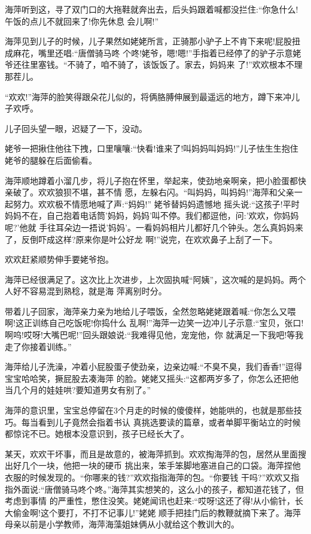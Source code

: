 \documentclass[11pt,a4paper,onecolumn]{article}
\begin{document}
海萍听到这，寻了双门口的大拖鞋就奔出去，后头妈跟着喊都没拦住:``你急什么!午饭的点儿不就回来了!你先休息
会儿啊!''

海萍见到儿子的时候，儿子果然如姥姥所言，正骑那小驴子上不肯下来呢!屁股扭成麻花，嘴里还唱:``唐僧骑马咚
个咚!姥爷，嗯!嗯!''手指着已经停了的驴子示意姥爷还往里塞钱。``不骑了，咱不骑了，该饭饭了。家去，妈妈来
了!''欢欢根本不理那茬儿。

``欢欢!''海萍的脸笑得跟朵花儿似的，将俩胳膊伸展到最遥远的地方，蹲下来冲儿子欢呼。

儿子回头望一眼，迟疑了一下，没动。

姥爷一把揪住他往下拽，口里嚷嚷:``快看!谁来了!叫妈妈叫妈妈!''儿子怯生生抱住姥爷的腿躲在后面偷看。

海萍顺地蹲着小溜几步，将儿子抱在怀里，举起来，使劲地亲啊亲，把小脸蛋都快亲破了。欢欢狼狈不堪，甚不情
愿，左躲右闪。``叫妈妈，叫妈妈!''海萍和父亲一起努力。欢欢极不情愿地喊了声:``妈妈!'' 姥爷替妈妈遗憾地
摇头说:``这孩子!平时妈妈不在，自己抱着电话筒'妈妈，妈妈'叫不停。我们都逗他，问:'欢欢，你妈妈呢?'他就
手往耳朵边一捂说'妈妈'。一看妈妈相片儿都好几个钟头。怎么真妈妈来了，反倒吓成这样?原来你是叶公好龙
啊!''说完，在欢欢鼻子上刮了一下。

欢欢赶紧顺势伸手要姥爷抱。

海萍已经很满足了。这次比上次进步，上次固执喊``阿姨''，这次喊的是妈妈。两个人好不容易混到熟稔，就是海
萍离别时分。

带着儿子回家，海萍亲力亲为地给儿子喂饭，全然忽略姥姥跟着喊:``你怎么又喂啊!这正训练自己吃饭呢!你捣什么
乱啊!''海萍一边笑一边冲儿子示意:``宝贝，张口!啊呜!哎呀!大嘴巴呢!''回头跟娘说:``我难得见他，宠宠他，你
就满足一下我吧!等我走了你接着训练。''

海萍给儿子洗澡，冲着小屁股蛋子使劲亲，边亲边喊:``不臭不臭，我们香香!''逗得宝宝哈哈笑，撅屁股去凑海萍
的脸。姥姥又摇头:``这都两岁多了，你怎么还把他当几个月的娃娃哄?要知道男女有别了。''

海萍的意识里，宝宝总停留在3个月走的时候的傻傻样，她能哄的，也就是那些技巧。每当看到儿子竟然会指着书认
真挑选要读的篇章，或者单脚平衡站立的时候都惊诧不已。她根本没意识到，孩子已经长大了。

某天，欢欢干坏事，而且是故意的，被海萍抓到。欢欢掏海萍的包，居然从里面搜出好几个一块，他把一块的硬币
挑出来，笨手笨脚地塞进自己的口袋。海萍捏他衣服的时候发现的。``你哪来的钱?''欢欢指指海萍的包。``你要钱
干吗?''欢欢又指指外面说:``唐僧骑马咚个咚。''海萍其实想笑的，这么小的孩子，都知道花钱了，但考虑到事情
的严重性，憋住没笑。姥姥闻讯也赶来:``哎呀!这还了得!从小偷针，长大偷金啊!这个要打，不打不记事儿!''姥姥
顺手把挂门后的教鞭就摘下来了。海萍母亲以前是小学教师，海萍海藻姐妹俩从小就给这个教训大的。
\end{document}
